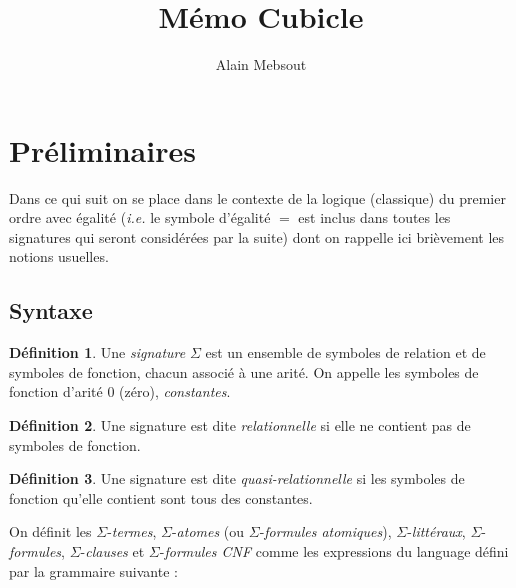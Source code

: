 \documentclass[a4paper, twoside]{scrartcl}
\title{Mémo Cubicle}
\author{Alain Mebsout\\
  \multicolumn{1}{p{.7\textwidth}}{\centering\emph{LRI, Université Paris Sud}}}
\theoremstyle{plain}%
\theoremstyle{definition}
\newtheorem{defn}{Définition}[section]
\theoremstyle{remark}
\begin{document}
\maketitle

\section{Préliminaires}

Dans ce qui suit on se place dans le contexte de la logique
(classique) du premier ordre avec égalité (\emph{i.e.} le symbole
d'égalité $=$ est inclus dans toutes les signatures qui seront
considérées par la suite) dont on rappelle ici brièvement les notions
usuelles.

\subsection{Syntaxe}

\begin{defn}
  Une \emph{signature} $\Sigma$ est un ensemble de symboles de
  relation et de symboles de fonction, chacun associé à une arité. On
  appelle les symboles de fonction d'arité $0$ (zéro),
  \emph{constantes}.
\end{defn}

\begin{defn} %
  Une signature est dite \emph{relationnelle} si elle ne contient pas
  de symboles de fonction.
\end{defn}

\begin{defn} %
  Une signature est dite \emph{quasi-relationnelle} si les symboles de
  fonction qu'elle contient sont tous des constantes.
\end{defn}

On définit les $\Sigma$-\emph{termes}, $\Sigma$-\emph{atomes} (ou
$\Sigma$-\emph{formules atomiques}), $\Sigma$-\emph{littéraux},
$\Sigma$-\emph{formules}, $\Sigma$-\emph{clauses} et
$\Sigma$-\emph{formules CNF} comme les expressions du language défini par
la grammaire suivante :

\end{document}
